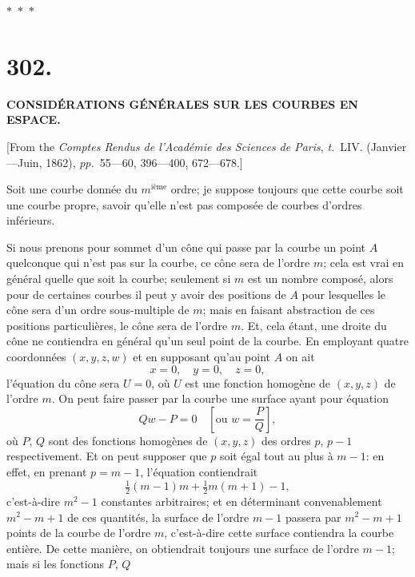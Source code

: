 \documentclass[11pt,a4paper]{article}
\newcommand{\tome}{\textit{t.}}
\newcommand{\pages}{\textit{pp.}}
\newcommand{\asterism}{\par\begin{center}$\ast$~$\ast$~$\ast$\end{center}\par}
\begin{document}
\asterism

\clearpage

\section*{302.}

\begin{center}
\textbf{CONSID\'{E}RATIONS G\'{E}N\'{E}RALES SUR LES COURBES EN ESPACE.}
\end{center}

[From the \textit{Comptes Rendus de l'Acad\'{e}mie des Sciences de Paris}, \tome~LIV. (Janvier---Juin, 1862), \pages~55---60, 396---400, 672---678.]

\medskip

Soit une courbe donn\'{e}e du $m^{\text{i\`{e}me}}$ ordre; je suppose toujours que cette courbe soit une courbe propre, savoir qu'elle n'est pas compos\'{e}e de courbes d'ordres inf\'{e}rieurs.

Si nous prenons pour sommet d'un c\^{o}ne qui passe par la courbe un point $A$ quelconque qui n'est pas sur la courbe, ce c\^{o}ne sera de l'ordre $m$; cela est vrai en g\'{e}n\'{e}ral quelle que soit la courbe; seulement si $m$ est un nombre compos\'{e}, alors pour de certaines courbes il peut y avoir des positions de $A$ pour lesquelles le c\^{o}ne sera d'un ordre sous-multiple de $m$; mais en faisant abstraction de ces positions particuli\`{e}res, le c\^{o}ne sera de l'ordre $m$. Et, cela \'{e}tant, une droite du c\^{o}ne ne contiendra en g\'{e}n\'{e}ral qu'un seul point de la courbe. En employant quatre coordonn\'{e}es $(x, y, z, w)$ et en supposant qu'au point $A$ on ait
\[
x = 0, \quad y = 0, \quad z = 0,
\]
l'\'{e}quation du c\^{o}ne sera $U = 0$, o\`{u} $U$ est une fonction homog\`{e}ne de $(x, y, z)$ de l'ordre $m$. On peut faire passer par la courbe une surface ayant pour \'{e}quation
\[
Qw - P = 0 \quad \left[\text{ou } w = \frac{P}{Q}\right],
\]
o\`{u} $P$, $Q$ sont des fonctions homog\`{e}nes de $(x, y, z)$ des ordres $p$, $p-1$ respectivement. Et on peut supposer que $p$ soit \'{e}gal tout au plus \`{a} $m-1$: en effet, en prenant $p = m-1$, l'\'{e}quation contiendrait
\[
\tfrac{1}{2}(m-1)m + \tfrac{1}{2}m(m+1) - 1,
\]
c'est-\`{a}-dire $m^2 - 1$ constantes arbitraires; et en d\'{e}terminant convenablement $m^2 - m + 1$ de ces quantit\'{e}s, la surface de l'ordre $m - 1$ passera par $m^2 - m + 1$ points de la courbe de l'ordre $m$, c'est-\`{a}-dire cette surface contiendra la courbe enti\`{e}re. De cette mani\`{e}re, on obtiendrait toujours une surface de l'ordre $m - 1$; mais si les fonctions $P$, $Q$
\end{document}
